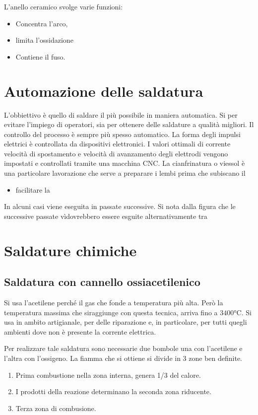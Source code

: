 
L'anello ceramico svolge varie funzioni:
\begin{itemize}
\item Concentra l'arco,
\item limita l'ossidazione 
\item Contiene il fuso.
\end{itemize}

\section{Automazione delle saldatura}
L'obbiettivo è quello di saldare il più possibile in maniera automatica.
Si per evitare l'impiego di operatori, sia per ottenere delle saldature a qualità migliori.
Il controllo del processo è sempre più spesso automatico. La forma degli impulsi elettrici è controllata da dispositivi elettronici.
I valori ottimali di corrente velocità di spostamento e velocità di avanzamento degli elettrodi vengono impostati e controllati tramite una macchina \ac{CNC}.
La cianfrinatura o viessol è una particolare lavorazione che serve a preparare i lembi prima che subiscano il
\begin{itemize}
\item facilitare la \todo{\\aggiungi}
\end{itemize}

In alcuni casi viene eseguita in passate successive.
Si nota dalla figura  che le successive passate vìdovrebbero essere esguite alternativamente tra 

\section{Saldature chimiche}
\subsection{Saldatura con cannello ossiacetilenico}
Si usa l'acetilene perché il gas che fonde a temperatura più alta.
Però la temperatura massima che siraggiunge con questa tecnica, arriva fino a $3400\unit{\celsius}$. Si usa in ambito artigianale, per delle riparazione e, in particolare, per tutti quegli ambienti dove non è presente la corrente elettrica.

Per realizzare tale saldatura sono necessarie due bombole una con l'acetilene e l'altra con l'ossigeno.
La fiamma che si ottiene si divide in 3 zone ben definite.
\begin{enumerate}
\item Prima combustione nella zona interna, genera 1/3 del calore.
\item I prodotti della reazione determinano la seconda zona riducente.
\item Terza zona di combusione.
\end{enumerate}

